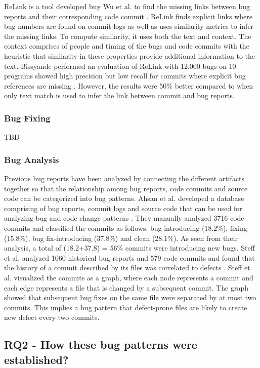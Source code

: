 \documentclass[conference]{IEEEtran}
\begin{document}
ReLink is a tool developed buy Wu et al. to find the missing links between bug reports and their corresponding code commit \cite{relink_wu}. ReLink finds explicit links where bug numbers are found on commit logs as well as uses similarity metrics to infer the missing links. To compute similarity, it uses both the text and context. The context comprises of people and timing of the bugs and code commits with the heuristic that similarity in these properties provide additional information to the text. Bissyande performed an evaluation of ReLink with 12,000 bugs on 10 programs showed high precision but low recall for commits where explicit bug references are missing \cite{empirical_bissyande}. However, the results were 50\% better compared to when only text match is used to infer the link between commit and bug reports.


\subsubsection{Bug Fixing}

TBD

\subsubsection{Bug Analysis}
Previous bug reports have been analyzed by connecting the different artifacts together so that the relationship among bug reports, code commits and source code can be categorized into bug patterns. Ahsan et al. developed a database comprising of bug reports, commit logs and source code that can be used for analyzing bug and code change patterns \cite{database_ahsan}. They manually analyzed 3716 code commits and classified the commits as follows: bug introducing (18.2\%), fixing (15.8\%), bug fix-introducing (37.8\%) and clean (28.1\%). As seen from their analysis, a total of (18.2+37.8) = 56\%  commits were introducing new bugs. Steff et al. analyzed 1060 historical bug reports and 579 code commits and found that the history of a commit described by its files was correlated to defects \cite{co_evolution_steff}. Steff et al. visualized the commits as a graph, where each node represents a commit and each edge represents a file that is changed by a subsequent commit. The graph showed that subsequent bug fixes on the same file were separated by at most two commits. This implies a bug pattern that defect-prone files are likely to create new defect every two commits.


\subsection{RQ2 - How these bug patterns were established?} %
\label{sub:item_rq2}
\end{document}
